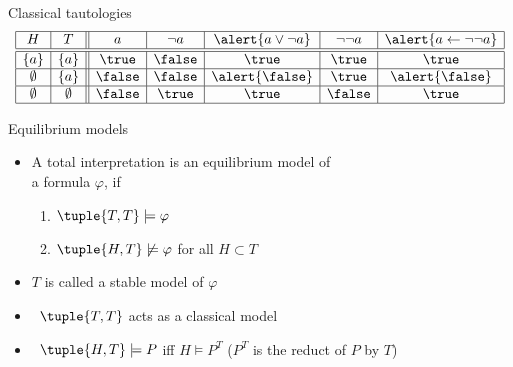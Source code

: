 \begin{frame}{Classical tautologies}
\centering
  \[
    \begin{array}{| c | c || c | c | c | c | c |}
      \hline
      H         & T          & a      & \neg a & \alert{a \vee \neg a} & \neg\neg a & \alert{a \leftarrow \neg\neg a}
      \\\hline\hline
      \{ a \}   & \{ a \}    & \true  & \false & \true                 & \true      & \true
      \\\hline
      \emptyset & \{ a \}    & \false & \false & \alert{\false}        & \true      & \alert{\false}
      \\\hline
      \emptyset & \emptyset  & \false & \true  & \true                 & \false     & \true
      \\\hline
    \end{array}
  \]
\end{frame}
\begin{frame}{Equilibrium models}
  \begin{itemize}
  \item A total interpretation  is an \alert{equilibrium model} of\\
    a formula $\varphi$,
    if
    \par
    \smallskip
    \begin{enumerate}\normalsize
    \item
      \(
      \tuple{ T,T}\models\varphi
      \)
    \item
      \(
      \tuple{H,T}\not\models\varphi
      \)
      for all $H\subset T$
    \end{enumerate}
    \smallskip
  \item <2-> $T$ is called a \alert{stable model} of $\varphi$
    \bigskip
  \item<3->  \ $\tuple{T,T}$ acts as a classical model
    \smallskip
  \item<4->  \ $\tuple{H,T} \models P$ iff $H \models P^T$ \hfill ($P^T$ is the reduct of $P$ by $T$)
  \end{itemize}
\end{frame}
%
